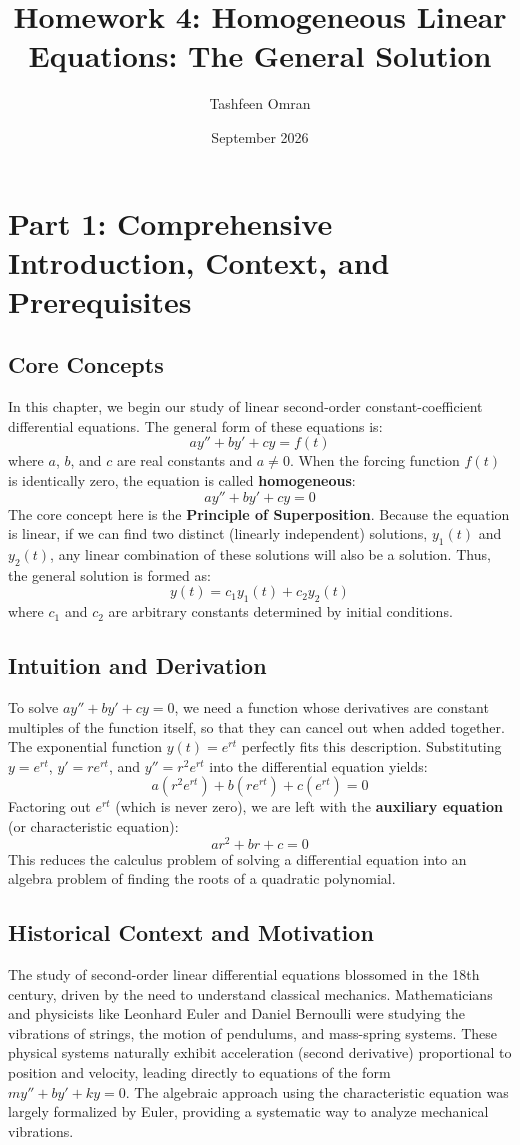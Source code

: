 \documentclass[12pt]{article}
\title{Homework 4: Homogeneous Linear Equations: The General Solution}
\author{Tashfeen Omran}
\date{September 2026}
\begin{document}
\maketitle
\tableofcontents
\newpage

\section{Part 1: Comprehensive Introduction, Context, and Prerequisites}

\subsection{Core Concepts}
In this chapter, we begin our study of linear second-order constant-coefficient differential equations. The general form of these equations is:
\[ a y'' + b y' + c y = f(t) \]
where $a$, $b$, and $c$ are real constants and $a \neq 0$. When the forcing function $f(t)$ is identically zero, the equation is called \textbf{homogeneous}:
\[ a y'' + b y' + c y = 0 \]
The core concept here is the \textbf{Principle of Superposition}. Because the equation is linear, if we can find two distinct (linearly independent) solutions, $y_1(t)$ and $y_2(t)$, any linear combination of these solutions will also be a solution. Thus, the general solution is formed as:
\[ y(t) = c_1 y_1(t) + c_2 y_2(t) \]
where $c_1$ and $c_2$ are arbitrary constants determined by initial conditions.

\subsection{Intuition and Derivation}
To solve $a y'' + b y' + c y = 0$, we need a function whose derivatives are constant multiples of the function itself, so that they can cancel out when added together. The exponential function $y(t) = e^{rt}$ perfectly fits this description. 
Substituting $y = e^{rt}$, $y' = r e^{rt}$, and $y'' = r^2 e^{rt}$ into the differential equation yields:
\[ a(r^2 e^{rt}) + b(r e^{rt}) + c(e^{rt}) = 0 \]
Factoring out $e^{rt}$ (which is never zero), we are left with the \textbf{auxiliary equation} (or characteristic equation):
\[ a r^2 + b r + c = 0 \]
This reduces the calculus problem of solving a differential equation into an algebra problem of finding the roots of a quadratic polynomial.

\subsection{Historical Context and Motivation}
The study of second-order linear differential equations blossomed in the 18th century, driven by the need to understand classical mechanics. Mathematicians and physicists like Leonhard Euler and Daniel Bernoulli were studying the vibrations of strings, the motion of pendulums, and mass-spring systems. These physical systems naturally exhibit acceleration (second derivative) proportional to position and velocity, leading directly to equations of the form $m y'' + b y' + k y = 0$. The algebraic approach using the characteristic equation was largely formalized by Euler, providing a systematic way to analyze mechanical vibrations.
\end{document}
